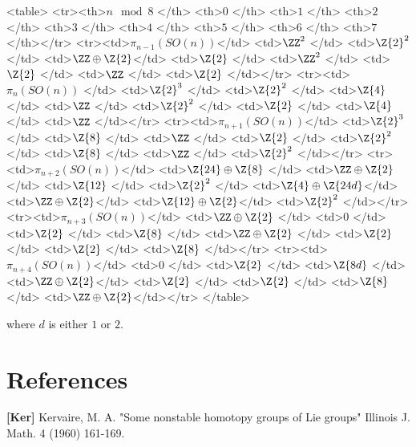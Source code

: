 \documentclass{amsart}
\begin{document}
<table>
	<tr><th>$n\mod 8$         </th> <th>$0$                 </th> <th>$1$             </th> <th>$2$             </th> <th>$3$             </th> <th>$4$                 </th> <th>$5$             </th> <th>$6$                </th> <th>$7$             </th></tr>
<tr><td>$\pi_{n-1}(SO(n))$</td> <td>$\ZZ^2$             </td> <td>$\Z{2}^2$       </td> <td>$\ZZ\oplus\Z{2}$</td> <td>$\Z{2}$         </td> <td>$\ZZ^2$             </td> <td>$\Z{2}$         </td> <td>$\ZZ$              </td> <td>$\Z{2}$         </td></tr>
<tr><td>$\pi_{n}(SO(n))$  </td> <td>$\Z{2}^3$           </td> <td>$\Z{2}^2$       </td> <td>$\Z{4}$         </td> <td>$\ZZ$           </td> <td>$\Z{2}^2$           </td> <td>$\Z{2}$         </td> <td>$\Z{4}$            </td> <td>$\ZZ$           </td></tr>
<tr><td>$\pi_{n+1}(SO(n))$</td> <td>$\Z{2}^3$           </td> <td>$\Z{8}$         </td> <td>$\ZZ$           </td> <td>$\Z{2}$         </td> <td>$\Z{2}^2$           </td> <td>$\Z{8}$         </td> <td>$\ZZ$              </td> <td>$\Z{2}^2$       </td></tr>
<tr><td>$\pi_{n+2}(SO(n))$</td> <td>$\Z{24}\oplus\Z{8}$ </td> <td>$\ZZ\oplus\Z{2}$</td> <td>$\Z{12}$        </td> <td>$\Z{2}^2$       </td> <td>$\Z{4}\oplus\Z{24d}$</td> <td>$\ZZ\oplus\Z{2}$</td> <td>$\Z{12}\oplus\Z{2}$</td> <td>$\Z{2}^2$       </td></tr>
<tr><td>$\pi_{n+3}(SO(n))$</td> <td>$\ZZ\oplus\Z{2}$    </td> <td>$0$             </td> <td>$\Z{2}$         </td> <td>$\Z{8}$         </td> <td>$\ZZ\oplus\Z{2}$    </td> <td>$\Z{2}$         </td> <td>$\Z{2}$            </td> <td>$\Z{8}$         </td></tr>
<tr><td>$\pi_{n+4}(SO(n))$</td> <td>$0$                 </td> <td>$\Z{2}$         </td> <td>$\Z{8d}$        </td> <td>$\ZZ\oplus\Z{2}$</td> <td>$\Z{2}$             </td> <td>$\Z{2}$         </td> <td>$\Z{8}$            </td> <td>$\ZZ\oplus\Z{2}$</td></tr>
</table>

where $d$ is either $1$ or $2$.

\section{References}
{\bf [Ker]} Kervaire, M. A. "Some nonstable homotopy groups of Lie groups" Illinois J. Math. 4 (1960) 161-169.
\end{document}

